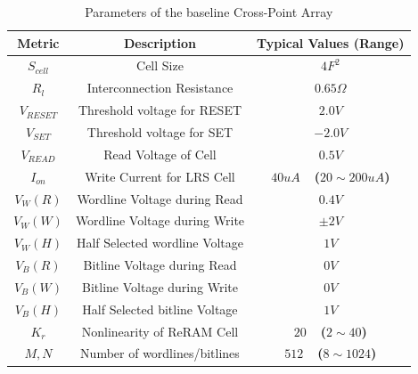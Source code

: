 \begin{table}[!b]
  \centering
  \scriptsize
    \scriptsize
  \caption{Parameters of the baseline Cross-Point Array}\label{table:parameter}
  \vspace{-5pt}
  \begin{tabular}{c|c|c}
    \hline    \hline
    \textbf{Metric} & \textbf{Description} & \textbf{Typical Values (Range)} \\
    \hline
    \textbf{$S_{cell}$} & Cell Size & \textbf{$4F^2$} \\
    \textbf{$R_l$} &  Interconnection Resistance&\textbf{$0.65\Omega$} \\
    \textbf{$V_{RESET}$} & Threshold voltage for RESET&\textbf{$2.0V$} \\
    \textbf{$V_{SET}$} & Threshold voltage for SET&\textbf{$-2.0V$} \\
    \textbf{$V_{READ}$} & Read Voltage of Cell&\textbf{$0.5V$} \\
    \textbf{$I_{on}$} & Write Current for LRS Cell &\textbf{$40uA$~~($20\sim200uA$)} \\
    \textbf{$V_{W}(R)$} & Wordline Voltage during Read &\textbf{$0.4V$} \\
    \textbf{$V_{W}(W)$} & Wordline Voltage during Write  &\textbf{$\pm2V$} \\
    \textbf{$V_{W}(H)$} & Half Selected wordline Voltage &\textbf{$1V$} \\
    \textbf{$V_{B}(R)$} & Bitline Voltage during Read  &\textbf{$0V$} \\
    \textbf{$V_{B}(W)$} & Bitline Voltage during Write  &\textbf{$0V$} \\
    \textbf{$V_{B}(H)$} & Half Selected bitline Voltage &\textbf{$1V$} \\
    \textbf{$K_r$} & Nonlinearity of ReRAM Cell &\textbf{$20$~~($2\sim40$)} \\
    \textbf{$M,N$} & Number of wordlines/bitlines &\textbf{$512$~~($8\sim1024$)} \\
    \hline
  \end{tabular}
  \vspace{-10pt}
\end{table}

